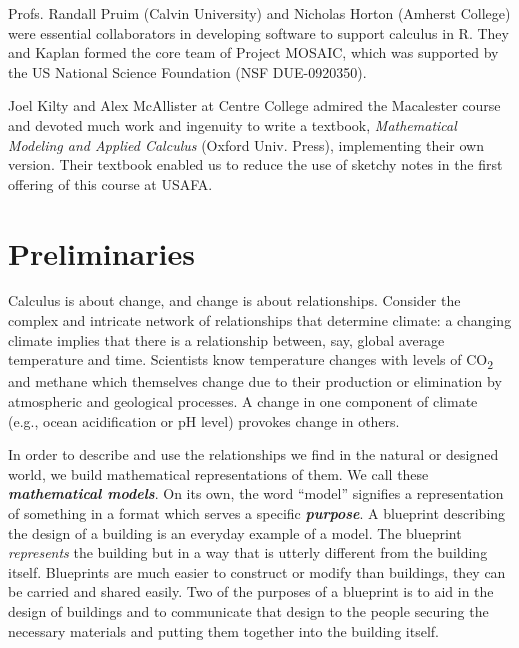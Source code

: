 \documentclass[
  letterpaper,
  DIV=11,
  numbers=noendperiod,
  oneside]{article}
\begin{document}
Profs. Randall Pruim (Calvin University) and Nicholas Horton (Amherst
College) were essential collaborators in developing software to support
calculus in R. They and Kaplan formed the core team of Project MOSAIC,
which was supported by the US National Science Foundation (NSF
DUE-0920350).

Joel Kilty and Alex McAllister at Centre College admired the Macalester
course and devoted much work and ingenuity to write a textbook,
\emph{Mathematical Modeling and Applied Calculus} (Oxford Univ. Press),
implementing their own version. Their textbook enabled us to reduce the
use of sketchy notes in the first offering of this course at USAFA.

\part{Preliminaries}

Calculus is about change, and change is about relationships. Consider
the complex and intricate network of relationships that determine
climate: a changing climate implies that there is a relationship
between, say, global average temperature and time. Scientists know
temperature changes with levels of CO\textsubscript{2} and methane which
themselves change due to their production or elimination by atmospheric
and geological processes. A change in one component of climate (e.g.,
ocean acidification or pH level) provokes change in others.

In order to describe and use the relationships we find in the natural or
designed world, we build mathematical representations of them. We call
these \textbf{\emph{mathematical models}}. On its own, the word
``model'' signifies a representation of something in a format which
serves a specific \textbf{\emph{purpose}}. A blueprint describing the
design of a building is an everyday example of a model. The blueprint
\emph{represents} the building but in a way that is utterly different
from the building itself. Blueprints are much easier to construct or
modify than buildings, they can be carried and shared easily. Two of the
purposes of a blueprint is to aid in the design of buildings and to
communicate that design to the people securing the necessary materials
and putting them together into the building itself.

\end{document}
